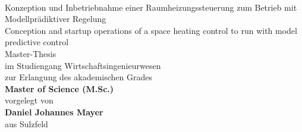 %
%

\begin{titlepage}
   \mbox{}\\
   \rmfamily\huge
   \centering
	\rmfamily\mdseries\huge{Konzeption und Inbetriebnahme einer Raumheizungssteuerung zum Betrieb mit Modellprädiktiver Regelung}
   \vspace{1\baselineskip}\\
	\rmfamily\mdseries\upshape\normalsize{Conception and startup operations of a space heating control to run with model predictive control}
  \vspace{3\baselineskip}\\
   \rmfamily\mdseries\upshape\normalsize{
 Master-Thesis\\
im Studiengang Wirtschaftsingenieurwesen} 
  \vspace{2\baselineskip}\\
  \rmfamily\mdseries\upshape\normalsize{	
zur Erlangung des akademischen Grades\\
\textsf{\textbf{Master of Science (M.Sc.)}}}\\
   \vspace{3\baselineskip}
   \rmfamily\mdseries\upshape\normalsize{
   vorgelegt von\\
   \textsf{\textbf{Daniel Johannes Mayer}}\\
   aus Sulzfeld}
   \vspace{3\baselineskip}\\
\flushleft
\rmfamily\mdseries{}
   \vspace{3\baselineskip}\\
\centering\   \rmfamily\mdseries{}	   
\end{titlepage}


